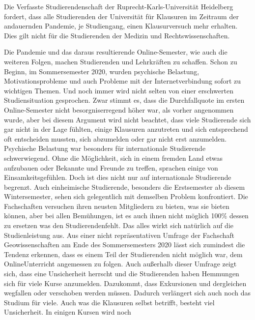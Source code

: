     {
        Die Verfasste Studierendenschaft der Ruprecht-Karls-Universität Heidelberg fordert,
        dass alle Studierenden der Universität für Klausuren im Zeitraum der andauernden
        Pandemie, je Studiengang, einen Klausurversuch mehr erhalten.\\
        Dies gilt nicht für die Studierenden der Medizin und Rechtswissenschaften.

    }{
        Die Pandemie und das daraus resultierende Online-Semester, wie auch die weiteren
        Folgen, machen Studierenden und Lehrkräften zu schaffen. Schon zu Beginn, im
        Sommersemester 2020, wurden psychische Belastung, Motivationsprobleme und auch
        Probleme mit der Internetverbindung sofort zu wichtigen Themen. Und noch immer wird
        nicht selten von einer erschwerten Studiensituation gesprochen. Zwar stimmt es, dass die
        Durchfallquote im ersten Online-Semester nicht besorgniserregend höher war, als vorher
        angenommen wurde, aber bei diesem Argument wird nicht beachtet, dass viele
        Studierende sich gar nicht in der Lage fühlten, einige Klausuren anzutreten und sich
        entsprechend oft entscheiden mussten, sich abzumelden oder gar nicht erst anzumelden.
        Psychische Belastung war besonders für internationale Studierende schwerwiegend.
        Ohne die Möglichkeit, sich in einem fremden Land etwas aufzubauen oder Bekannte und
        Freunde zu treffen, sprachen einige von Einsamkeitsgefühlen. Doch ist dies nicht nur auf
        internationale Studierende begrenzt. Auch einheimische Studierende, besonders die
        Erstsemester ab diesem Wintersemester, sehen sich gelegentlich mit demselben Problem
        konfrontiert. Die Fachschaften versuchen ihren neusten Mitgliedern zu bieten, was sie
        bieten können, aber bei allen Bemühungen, ist es auch ihnen nicht möglich 100\% dessen
        zu ersetzen was den Studierendenfehlt. Das alles wirkt sich natürlich auf die
        Studienleistung aus. Aus einer nicht repräsentativen Umfrage der Fachschaft
        Geowissenschaften am Ende des Sommersemesters 2020 lässt sich zumindest die
        Tendenz erkennen, dass es einem Teil der Studierenden nicht möglich war, dem
        OnlineUnterricht angemessen zu folgen. Auch außerhalb dieser Umfrage zeigt sich, dass eine
        Unsicherheit herrscht und die Studierenden haben Hemmungen sich für viele Kurse
        anzumelden. Dazukommt, dass Exkursionen und dergleichen wegfallen oder verschoben
        werden müssen. Dadurch verlängert sich auch noch das Studium für viele. Auch
        was die Klausuren selbst betrifft, besteht viel Unsicherheit. In einigen Kursen wird noch
}
